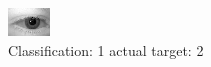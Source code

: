\begin{figure}[h!]
\begin{center}
\includegraphics[width=0.60\columnwidth]{figures/ID511_class_1_target_2.png}
\end{center}
\caption{ Classification: 1 actual target: 2}
\label{fig:ID511_class_1_target_2}
\end{figure}
